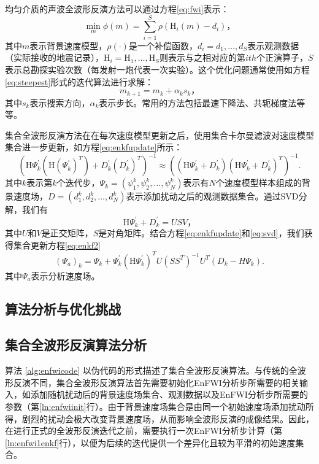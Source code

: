 \documentclass[degree=doctor]{thuthesis}
\begin{document}
均匀介质的声波全波形反演方法可以通过方程\ref{eq:fwi}表示：
\begin{equation}
\label{eq:fwi}
  \min_{m} \phi(m) = \sum_{i=1}^S \rho(\mbox{H}_i(m) - d_{i} )，
\end{equation}
其中$m$表示背景速度模型，$\rho(\cdot)$是一个补偿函数，$d_i=d_1, \ldots, d_S$表示观测数据（实际接收的地震记录），$\mbox{H}_i=\mbox{H}_1, \ldots, \mbox{H}_S$则表示与之相对应的第$i{th}$个正演算子，$S$表示总勘探实验次数（每发射一炮代表一次实验）。这个优化问题通常使用如方程\ref{eq:steepest}形式的迭代算法进行求解：
\begin{equation}
\label{eq:steepest}
m_{k+1} = m_{k} + \alpha_{k}s_k，
\end{equation}
其中$s_k$表示搜索方向，$\alpha_{k}$表示步长。常用的方法包括最速下降法、共轭梯度法等等。

集合全波形反演方法在在每次速度模型更新之后，使用集合卡尔曼滤波对速度模型集合进一步更新，如方程\ref{eq:enkfupdate}所示：
\begin{equation}
\label{eq:enkfupdate}
\left(\mbox{H}\Psi_k^{'}(\mbox{H}(\Psi_k^{'})^T)+D_k^{'}(D_k^{'})^T\right)^{-1}\approx\left((\mbox{H}\Psi_k^{'}+D_k^{'})(\mbox{H}\Psi_k^{'}+D_k^{'})^T\right)^{-1}.
\end{equation}
其中$k$表示第$k$个迭代步，$\Psi_k=(\psi_1^k,\psi_2^k,\ldots,\psi_N^k)$表示有$N$个速度模型样本组成的背景速度场，$D=(d_1^k,d_2^k,\ldots,d_N^k)$表示添加扰动之后的观测数据集合。通过SVD分解，我们有
\begin{equation}
\label{eq:svd}
\mbox{H}\Psi_k^{'}+D_k^{'}=USV，
\end{equation}
其中$U$和$V$是正交矩阵，$S$是对角矩阵。结合方程\ref{eq:enkfupdate}和\ref{eq:svd}，我们获得集合更新方程\ref{eq:enkf2}
\begin{equation}
\label{eq:enkf2}
(\Psi_a)_k=\Psi_k+\Psi_k^{'}(\mbox{H}\Psi_k^{'})^TU(SS^T)^{-1}U^T(D_k-H\Psi_k).
\end{equation}
其中$\Psi_a$表示分析速度场。

\subsection{算法分析与优化挑战}

\subsection{集合全波形反演算法分析}
算法 \ref{alg:enfwicode} 以伪代码的形式描述了集合全波形反演算法。与传统的全波形反演不同，集合全波形反演算法首先需要初始化EnFWI分析步所需要的相关输入，如添加随机扰动后的背景速度场集合、观测数据以及EnFWI分析步所需要的参数（第\ref{ln:enfwiinit}行）。由于背景速度场集合是由同一个初始速度场添加扰动所得，剧烈的扰动会极大改变背景速度场，从而影响全波形反演的成像结果。因此，在进行正式的全波形反演迭代之前，需要执行一次EnFWI分析步计算（第\ref{ln:enfwi1enkf}行），以便为后续的迭代提供一个差异化且较为平滑的初始速度集合。
\end{document}
